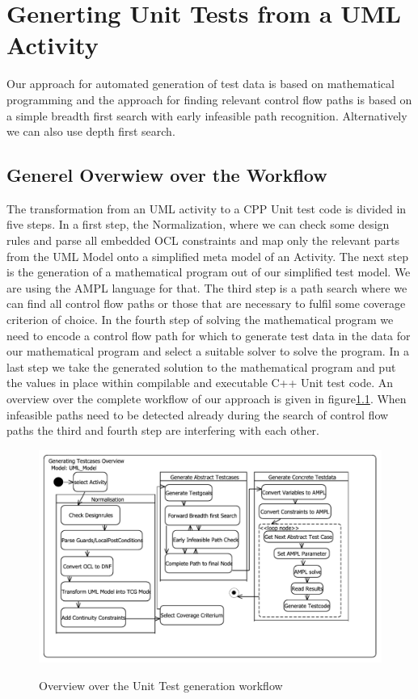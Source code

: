 \chapter{Generting Unit Tests from a UML Activity}
Our approach for automated generation of test data is based on mathematical programming and the approach for finding relevant control flow paths is based on a simple breadth first search with early infeasible path recognition. Alternatively we can also use depth first search.
\section{Generel Overwiew over the Workflow}
The transformation from an UML activity to a CPP Unit test code is divided in five steps. In a first step, the Normalization, where we can check some design rules and parse all embedded OCL constraints and map only the relevant parts from the UML Model onto a simplified meta model of an Activity. The next step is the generation of a mathematical program out of our simplified test model. We are using the AMPL language for that. The third step is a path search where we can find all control flow paths or  those that are necessary to fulfil some coverage criterion of choice. In the fourth step of solving the mathematical program we need to encode a control flow path for which to generate test data in the data for our mathematical program and select a suitable solver to solve the program. In a last step we take the generated solution to the mathematical program and put the values in place within compilable and executable C++ Unit test code. An overview over the complete workflow of our approach is given in figure\ref{fig:workflowOverview}. When infeasible paths need to be detected already during the search of control flow paths the third and fourth step are interfering with each other.
\begin{figure}
\includegraphics[width=\textwidth]{pics/workflow.pdf}
\label{fig:workflowOverview}
\caption{Overview over the Unit Test generation workflow}
\end{figure}
